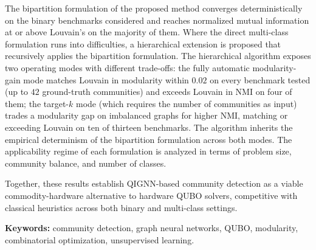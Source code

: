 The bipartition formulation of the proposed method converges
deterministically on the binary benchmarks considered and
reaches normalized mutual information at or above Louvain's on
the majority of them. Where the direct multi-class formulation
runs into difficulties, a hierarchical extension is proposed that
recursively applies the bipartition formulation. The hierarchical
algorithm exposes two operating modes with different trade-offs:
the fully automatic modularity-gain mode matches Louvain in
modularity within $0.02$ on every benchmark tested (up to $42$
ground-truth communities) and exceeds Louvain in NMI on four of
them; the target-$k$ mode (which requires the number of
communities as input) trades a modularity gap on imbalanced
graphs for higher NMI, matching or exceeding Louvain on ten of
thirteen benchmarks. The algorithm inherits the empirical
determinism of the bipartition formulation across both modes.
The applicability regime of each formulation is analyzed in
terms of problem size, community balance, and number of classes.

Together, these results establish QIGNN-based community detection
as a viable commodity-hardware alternative to hardware QUBO
solvers, competitive with classical heuristics across both binary
and multi-class settings.

\bigskip

\textbf{Keywords:} community detection, graph neural networks, QUBO,
modularity, combinatorial optimization, unsupervised learning.

\newpage
